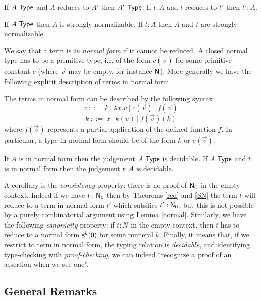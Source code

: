 \begin{thm}\label{red}
If $A~{\sf Type}$ and $A$ reduces to $A'$ then $A'~{\sf Type}$.
If $t:A$ and $t$ reduces to $t'$ then $t':A$.
\end{thm}

\begin{thm}\label{SN}
 If $A~{\sf Type}$ then $A$ is strongly normalizable.
If $t:A$ then $A$ and $t$ are strongly normalizable. 
\end{thm}

 We say that a term is {\em in normal form} if it cannot be reduced.
A closed normal type has to be a primitive type, i.e. of the form $c(\vec{v})$ for some
primitive constant $c$ (where $\vec{v}$ may be empty, for instance ${\sf N}$). 
More generally we have the following explicit description of terms in normal form.

\begin{lemma}\label{normal}
The terms in normal form can be described by the following syntax
$$
v~::=~ k~|~\lambda x.v~|~c(\vec{v})~|~f(\vec{v})
$$
$$
k~::=~x~|~k(v)~|~f(\vec{v})(k)
$$
where $f(\vec{v})$ represents a partial application of the defined function $f$.
In particular, a type in normal form should be of the form $k$ or $c(\vec{v})$.
\end{lemma}

\begin{proposition}
If $A$ is in normal form then the 
judgement $A~{\sf Type}$ is decidable. If $A~{\sf Type}$ and $t$ is in normal form then the judgement
$t:A$ is decidable.
\end{proposition}


 A corollary is the {\em consistency} property: there is no proof of ${\sf N}_0$ in the empty
context. Indeed if we have $t:{\sf N}_0$ then by Theorems \ref{red} and \ref{SN} the term $t$ will reduce
to a term in normal form $t'$ which satsifies $t':{\sf N}_0$, but this is not possible by a 
purely combinatorial argument using Lemma \ref{normal}. Similarly, we have the following
{\em canonicity} property: if $t:N$ in the empty context, then $t$ has to reduce to a
normal form ${\sf s}^k(0)$ for some numeral $k$. Finally, it means that, if we restrict to term
in normal form, the typing relation is {\em decidable}, and identifying type-checking with
{\em proof-checking}, we can indeed ``recognize a proof of an assertion when we see one''.

\subsection*{General Remarks}

